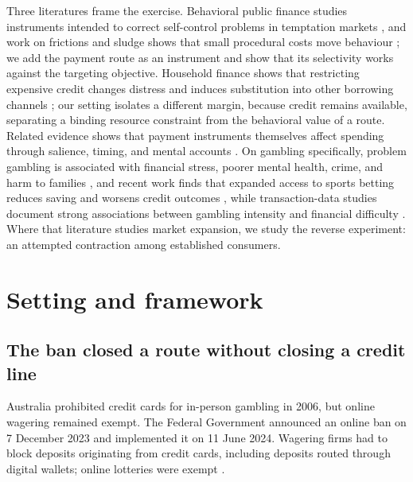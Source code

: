 \documentclass[12pt]{article}
\begin{document}
Three literatures frame the exercise. Behavioral public finance studies instruments intended to correct self-control problems in temptation markets \citep{GruberKoszegi2001_Addiction,ODonoghueRabin2006_OptimalSinTaxes,AllcottLockwoodTaubinsky2019,SchmackerSmed2023_SinTaxes}, and work on frictions and sludge shows that small procedural costs move behaviour \citep{Thaler2018_Sludge}; we add the payment route as an instrument and show that its selectivity works against the targeting objective. Household finance shows that restricting expensive credit changes distress and induces substitution into other borrowing channels \citep{Melzer2011_CreditAccess,Zinman2010_RestrictingCredit,Morse2011_PaydayLenders}; our setting isolates a different margin, because credit remains available, separating a binding resource constraint from the behavioral value of a route. Related evidence shows that payment instruments themselves affect spending through salience, timing, and mental accounts \citep{Feinberg1986_CreditCardStimuli,PrelecSimester2001_CreditCardEffect,Soman2001_PaymentMechanism,Jorring2023_PaymentChoice,GelmanRoussanov2024_MentalAccounts}. On gambling specifically, problem gambling is associated with financial stress, poorer mental health, crime, and harm to families \citep{Langham2016_gambling_harm_taxonomy,Adolphe2019_crime_review,Dowling2014_family_violence}, and recent work finds that expanded access to sports betting reduces saving and worsens credit outcomes \citep{BakerEtAl2024_GamblingAwayStability,HollenbeckEtAl2025_FinancialConsequences}, while transaction-data studies document strong associations between gambling intensity and financial difficulty \citep{MuggletonEtAl2021_BigFinancialData,MarionneauEtAl2023_IndebtedBankTransactions,ZendleNewall2024_OpenBankingGambling}. Where that literature studies market expansion, we study the reverse experiment: an attempted contraction among established consumers.

\section{Setting and framework}\label{sec:framework}

\subsection{The ban closed a route without closing a credit line}

Australia prohibited credit cards for in-person gambling in 2006, but online wagering remained exempt. The Federal Government announced an online ban on 7 December 2023 and implemented it on 11 June 2024. Wagering firms had to block deposits originating from credit cards, including deposits routed through digital wallets; online lotteries were exempt \citep{RegulationUseFinancialServicesOnlineGamblingAus,Rowland_credit_cards_ban_2024}.
\end{document}
